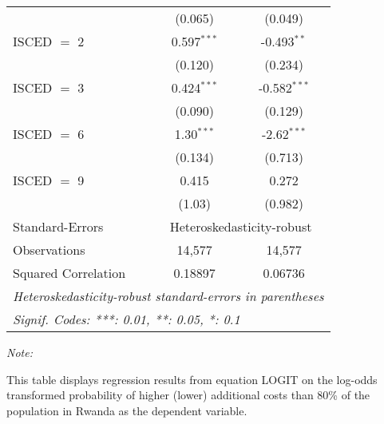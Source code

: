 \begin{table}[htbp!]
\begin{adjustbox}{width = 1\textwidth, max height = 0.95\textheight, center}
\begin{threeparttable}[b]
\begin{tabular}{lcc}
                                 & (0.065)       & (0.049)\\   
            ISCED $=$ 2          & 0.597$^{***}$ & -0.493$^{**}$\\   
                                 & (0.120)       & (0.234)\\   
            ISCED $=$ 3          & 0.424$^{***}$ & -0.582$^{***}$\\   
                                 & (0.090)       & (0.129)\\   
            ISCED $=$ 6          & 1.30$^{***}$  & -2.62$^{***}$\\   
                                 & (0.134)       & (0.713)\\   
            ISCED $=$ 9          & 0.415         & 0.272\\   
                                 & (1.03)        & (0.982)\\   
            \midrule 
            Standard-Errors & \multicolumn{2}{c}{Heteroskedasticity-robust} \\ 
            Observations         & 14,577        & 14,577\\  
            Squared Correlation  & 0.18897       & 0.06736\\  
            \midrule \midrule
            \multicolumn{3}{l}{\emph{Heteroskedasticity-robust standard-errors in parentheses}}\\
            \multicolumn{3}{l}{\emph{Signif. Codes: ***: 0.01, **: 0.05, *: 0.1}}\\
         \end{tabular}
         
         \begin{tablenotes}\item \medskip \textit{Note:}
            \item This table displays regression results from equation LOGIT on the log-odds transformed probability of higher (lower) additional costs than 80\% of the population in Rwanda as the dependent variable. 
         \end{tablenotes}
      \end{threeparttable}
   \end{adjustbox}
\end{table}



